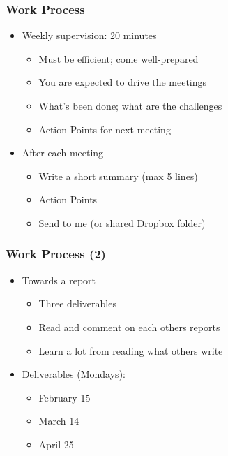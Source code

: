 \documentclass[hyperref={pdfpagelabels=false}, aspectratio=1610]{beamer}
\begin{document}
\begin{frame}
\frametitle{Work Process}
\begin{block}{}
 \begin{itemize}
  \item Weekly supervision: 20 minutes
  \begin{itemize}
  	\item Must be efficient; come well-prepared
  	\item You are expected to drive the meetings
  	\item What's been done; what are the challenges
  	\item Action Points for next meeting
  \end{itemize}
  \item<2-> After each meeting
  \begin{itemize}
  	\item<2-> Write a short summary (max 5 lines)
  	\item<2-> Action Points
  	\item<2-> Send to me (or shared Dropbox folder)
  \end{itemize}
 \end{itemize}
\end{block}
\end{frame}


\begin{frame}
\frametitle{Work Process (2)}
\begin{block}{}
 \begin{itemize}
  \item Towards a report
  \begin{itemize}
  	\item Three deliverables
  	\item Read and comment on each others reports
  	\item Learn a lot from reading what others write
  \end{itemize}
  \item<2-> Deliverables (Mondays):
  \begin{itemize}
  	\item<2-> February 15
  	\item<2-> March 14
  	\item<2-> April 25
  \end{itemize}
 \end{itemize}
\end{block}
\end{frame}
\end{document}
